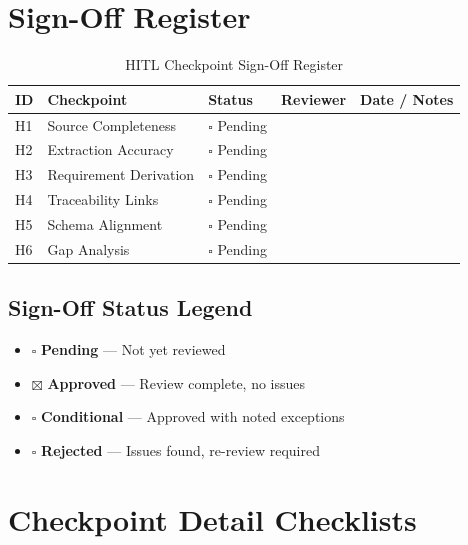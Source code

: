 \documentclass[11pt,a4paper,twoside]{report}
\begin{document}
\section{Sign-Off Register}
\label{sec:signoff-register}

\begin{table}[h]
\centering
\caption{HITL Checkpoint Sign-Off Register}
\label{tab:signoff-register}
\begin{tabularx}{\textwidth}{@{}C{1cm}L{3.5cm}C{2cm}C{2.5cm}L{3.5cm}@{}}
\toprule
\textbf{ID} & \textbf{Checkpoint} & \textbf{Status} & \textbf{Reviewer} & \textbf{Date / Notes} \\
\midrule
H1 & Source Completeness & $\square$ Pending & & \\
H2 & Extraction Accuracy & $\square$ Pending & & \\
H3 & Requirement Derivation & $\square$ Pending & & \\
H4 & Traceability Links & $\square$ Pending & & \\
H5 & Schema Alignment & $\square$ Pending & & \\
H6 & Gap Analysis & $\square$ Pending & & \\
\bottomrule
\end{tabularx}
\end{table}

\subsection{Sign-Off Status Legend}

\begin{itemize}[noitemsep]
\item $\square$ \textbf{Pending} --- Not yet reviewed
\item $\boxtimes$ \textbf{Approved} --- Review complete, no issues
\item $\square$ \textbf{Conditional} --- Approved with noted exceptions
\item $\square$ \textbf{Rejected} --- Issues found, re-review required
\end{itemize}

\section{Checkpoint Detail Checklists}
\label{sec:checkpoint-checklists}
\end{document}
